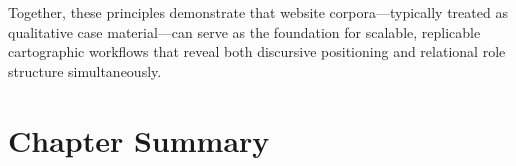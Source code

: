 \documentclass[../main.tex]{subfiles}
\begin{document}
Together, these principles demonstrate that website corpora---typically treated as qualitative case material---can serve as the foundation for scalable, replicable cartographic workflows that reveal both discursive positioning and relational role structure simultaneously.

\section{Chapter Summary}

%
\end{document}
